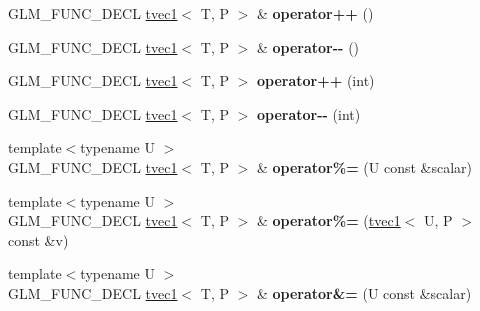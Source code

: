 \begin{DoxyCompactItemize}
\item 
\hypertarget{structglm_1_1tvec1_a073c75830716722cd4ffcb516788cec5}{G\-L\-M\-\_\-\-F\-U\-N\-C\-\_\-\-D\-E\-C\-L \hyperlink{structglm_1_1tvec1}{tvec1}$<$ T, P $>$ \& {\bfseries operator++} ()}\label{structglm_1_1tvec1_a073c75830716722cd4ffcb516788cec5}

\item 
\hypertarget{structglm_1_1tvec1_ae2afe02d40b7a469d33543f16307611a}{G\-L\-M\-\_\-\-F\-U\-N\-C\-\_\-\-D\-E\-C\-L \hyperlink{structglm_1_1tvec1}{tvec1}$<$ T, P $>$ \& {\bfseries operator-\/-\/} ()}\label{structglm_1_1tvec1_ae2afe02d40b7a469d33543f16307611a}

\item 
\hypertarget{structglm_1_1tvec1_a4dbefeaefe398e52093be02b638047cd}{G\-L\-M\-\_\-\-F\-U\-N\-C\-\_\-\-D\-E\-C\-L \hyperlink{structglm_1_1tvec1}{tvec1}$<$ T, P $>$ {\bfseries operator++} (int)}\label{structglm_1_1tvec1_a4dbefeaefe398e52093be02b638047cd}

\item 
\hypertarget{structglm_1_1tvec1_af4251163c1a4e5a83e2c09e4dd685ecd}{G\-L\-M\-\_\-\-F\-U\-N\-C\-\_\-\-D\-E\-C\-L \hyperlink{structglm_1_1tvec1}{tvec1}$<$ T, P $>$ {\bfseries operator-\/-\/} (int)}\label{structglm_1_1tvec1_af4251163c1a4e5a83e2c09e4dd685ecd}

\item 
\hypertarget{structglm_1_1tvec1_ace072e76c22bf899dd231ae01c9d8ce5}{{\footnotesize template$<$typename U $>$ }\\G\-L\-M\-\_\-\-F\-U\-N\-C\-\_\-\-D\-E\-C\-L \hyperlink{structglm_1_1tvec1}{tvec1}$<$ T, P $>$ \& {\bfseries operator\%=} (U const \&scalar)}\label{structglm_1_1tvec1_ace072e76c22bf899dd231ae01c9d8ce5}

\item 
\hypertarget{structglm_1_1tvec1_acb4b8e73890ac7f9a0b4700c1c268500}{{\footnotesize template$<$typename U $>$ }\\G\-L\-M\-\_\-\-F\-U\-N\-C\-\_\-\-D\-E\-C\-L \hyperlink{structglm_1_1tvec1}{tvec1}$<$ T, P $>$ \& {\bfseries operator\%=} (\hyperlink{structglm_1_1tvec1}{tvec1}$<$ U, P $>$ const \&v)}\label{structglm_1_1tvec1_acb4b8e73890ac7f9a0b4700c1c268500}

\item 
\hypertarget{structglm_1_1tvec1_aac7e37c4c558427b19fc125dc4f62adc}{{\footnotesize template$<$typename U $>$ }\\G\-L\-M\-\_\-\-F\-U\-N\-C\-\_\-\-D\-E\-C\-L \hyperlink{structglm_1_1tvec1}{tvec1}$<$ T, P $>$ \& {\bfseries operator\&=} (U const \&scalar)}\label{structglm_1_1tvec1_aac7e37c4c558427b19fc125dc4f62adc}


\end{DoxyCompactItemize}
